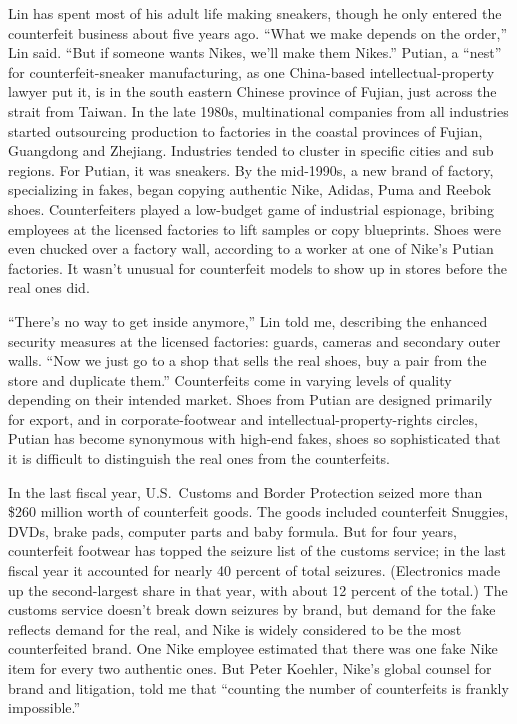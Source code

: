 ﻿\documentclass[12pt]{article}
\begin{document}
Lin has spent most of his adult life making sneakers, though he only entered the counterfeit
business about five years ago. ``What we make depends on the order,'' Lin said. ``But if someone
wants Nikes, we'll make them Nikes.'' Putian, a ``nest'' for counterfeit-sneaker manufacturing, as
one China-based intellectual-property lawyer put it, is in the south eastern Chinese province of
Fujian, just across the strait from Taiwan. In the late 1980s, multinational companies from all
industries started outsourcing production to factories in the coastal provinces of Fujian, Guangdong
and Zhejiang. Industries tended to cluster in specific cities and sub regions. For Putian, it was
sneakers. By the mid-1990s, a new brand of factory, specializing in fakes, began copying authentic
Nike, Adidas, Puma and Reebok shoes. Counterfeiters played a low-budget game of industrial
espionage, bribing employees at the licensed factories to lift samples or copy blueprints. Shoes
were even chucked over a factory wall, according to a worker at one of Nike's Putian factories. It
wasn't unusual for counterfeit models to show up in stores before the real ones did.

``There's no way to get inside anymore,'' Lin told me, describing the enhanced security measures at
the licensed factories: guards, cameras and secondary outer walls. ``Now we just go to a shop that
sells the real shoes, buy a pair from the store and duplicate them.'' Counterfeits come in varying
levels of quality depending on their intended market. Shoes from Putian are designed primarily for
export, and in corporate-footwear and intellectual-property-rights circles, Putian has become
synonymous with high-end fakes, shoes so sophisticated that it is difficult to distinguish the real
ones from the counterfeits.

In the last fiscal year, U.S.~Customs and Border Protection seized more than \$260 million worth of
counterfeit goods. The goods included counterfeit Snuggies, DVDs, brake pads, computer parts and
baby formula. But for four years, counterfeit footwear has topped the seizure list of the customs
service; in the last fiscal year it accounted for nearly 40 percent of total seizures. (Electronics
made up the second-largest share in that year, with about 12 percent of the total.) The customs
service doesn't break down seizures by brand, but demand for the fake reflects demand for the real,
and Nike is widely considered to be the most counterfeited brand. One Nike employee estimated that
there was one fake Nike item for every two authentic ones. But Peter Koehler, Nike's global counsel
for brand and litigation, told me that ``counting the number of counterfeits is frankly
impossible.''
\end{document}
